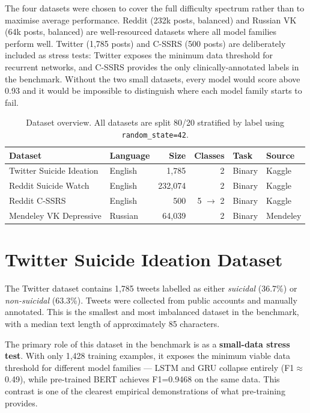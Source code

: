 \documentclass[12pt, a4paper, oneside]{report}
\begin{document}
The four datasets were chosen to cover the full difficulty spectrum rather than to maximise average performance. Reddit (232k posts, balanced) and Russian VK (64k posts, balanced) are well-resourced datasets where all model families perform well. Twitter (1,785 posts) and C-SSRS (500 posts) are deliberately included as stress tests: Twitter exposes the minimum data threshold for recurrent networks, and C-SSRS provides the only clinically-annotated labels in the benchmark. Without the two small datasets, every model would score above 0.93 and it would be impossible to distinguish where each model family starts to fail.

\begin{table}[H]
\centering
\caption{Dataset overview. All datasets are split 80/20 stratified by label using \texttt{random\_state=42}.}
\label{tab:datasets}
\begin{tabular}{llrrll}
\toprule
\textbf{Dataset} & \textbf{Language} & \textbf{Size} & \textbf{Classes} & \textbf{Task} & \textbf{Source} \\
\midrule
Twitter Suicide Ideation & English & 1,785 & 2 & Binary & Kaggle \\
Reddit Suicide Watch & English & 232,074 & 2 & Binary & Kaggle \\
Reddit C-SSRS & English & 500 & 5 $\rightarrow$ 2 & Binary & Kaggle \\
Mendeley VK Depressive & Russian & 64,039 & 2 & Binary & Mendeley \\
\bottomrule
\end{tabular}
\end{table}

\section{Twitter Suicide Ideation Dataset}

The Twitter dataset contains 1,785 tweets labelled as either \textit{suicidal} (36.7\%) or \textit{non-suicidal} (63.3\%). Tweets were collected from public accounts and manually annotated. This is the smallest and most imbalanced dataset in the benchmark, with a median text length of approximately 85 characters.

The primary role of this dataset in the benchmark is as a \textbf{small-data stress test}. With only 1,428 training examples, it exposes the minimum viable data threshold for different model families — LSTM and GRU collapse entirely (F1$\approx$0.49), while pre-trained BERT achieves F1=0.9468 on the same data. This contrast is one of the clearest empirical demonstrations of what pre-training provides.
\end{document}
